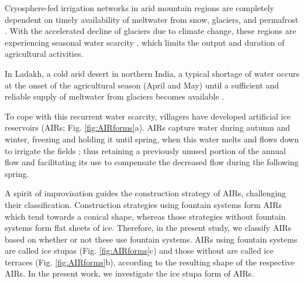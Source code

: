 \documentclass[tc, manuscript]{copernicus}
\begin{document}
\introduction

Cryosphere-fed irrigation networks in arid mountain regions are completely dependent on timely availability of
meltwater from snow, glaciers, and permafrost \citep{immerzeelImportanceVulnerabilityWorld2020,
farhanHydrologicalRegimesConjunction2015, tveitenGlacierGrowingLocal2007}. With the accelerated decline of
glaciers due to climate change, these regions are experiencing seasonal water scarcity
\citep{hoelzleStatusRoleAlpine2019, xenariosAralSeaBasin2019, barandunStateFutureCryosphere2020}, which limits the output and duration of agricultural activities.

In Ladakh, a cold arid desert in northern India, a typical shortage of water occurs at the onset
of the agricultural season (April and May) until a sufficient and reliable supply of meltwater from glaciers
becomes available \citep{norphelSnowWaterHarvesting2015, nusserLocalKnowledgeGlobal2016,
vincentEnergyClimateChange2009}. 

To cope with this recurrent water scarcity, villagers have developed artificial ice reservoirs (AIRs; Fig.
\ref{fig:AIRforms}a). AIRs capture water during autumn and winter, freezing and holding it until
spring, when this water melts and flows down to irrigate the fields \citep{ipccChapterHighMountain2019,
vinceGlacierMan2009, clouseLadakhArtificialGlaciers2017, nusserSociohydrologyArtificialGlaciers2019}; thus retaining a previously unused portion of the annual flow and facilitating its use to compensate the decreased flow during the following spring.

A spirit of improvisation guides the construction strategy of AIRs, challenging their classification.
Construction strategies using fountain systems form AIRs which tend towards a
conical shape, whereas those strategies without fountain systems form flat sheets of ice. Therefore, in the present study, we classify AIRs 
based on whether or not these use fountain systems. AIRs using fountain systems are called ice stupas (Fig.
\ref{fig:AIRforms}c) and those without are called ice terraces (Fig. \ref{fig:AIRforms}b), according to the resulting shape of the respective AIRs. In the present work, we investigate the ice
stupa form of AIRs.
\end{document}
